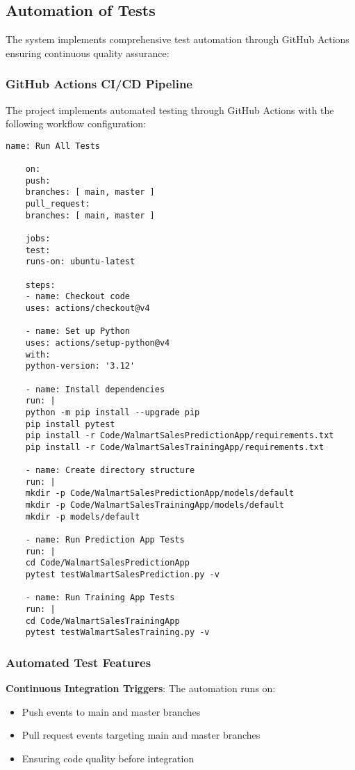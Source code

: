 \subsection{Automation of Tests}

The system implements comprehensive test automation through GitHub Actions ensuring continuous quality assurance:

\subsubsection{GitHub Actions CI/CD Pipeline}

The project implements automated testing through GitHub Actions with the following workflow configuration:

\begin{lstlisting}[language=MyPython, caption={GitHub Actions Test Automation Configuration}]
	name: Run All Tests
	
	on:
	push:
	branches: [ main, master ]
	pull_request:
	branches: [ main, master ]
	
	jobs:
	test:
	runs-on: ubuntu-latest
	
	steps:
	- name: Checkout code
	uses: actions/checkout@v4
	
	- name: Set up Python
	uses: actions/setup-python@v4
	with:
	python-version: '3.12'
	
	- name: Install dependencies
	run: |
	python -m pip install --upgrade pip
	pip install pytest
	pip install -r Code/WalmartSalesPredictionApp/requirements.txt
	pip install -r Code/WalmartSalesTrainingApp/requirements.txt
	
	- name: Create directory structure
	run: |
	mkdir -p Code/WalmartSalesPredictionApp/models/default
	mkdir -p Code/WalmartSalesTrainingApp/models/default
	mkdir -p models/default
	
	- name: Run Prediction App Tests
	run: |
	cd Code/WalmartSalesPredictionApp
	pytest testWalmartSalesPrediction.py -v
	
	- name: Run Training App Tests
	run: |
	cd Code/WalmartSalesTrainingApp
	pytest testWalmartSalesTraining.py -v
\end{lstlisting}

\subsubsection{Automated Test Features}

\textbf{Continuous Integration Triggers}: The automation runs on:
\begin{itemize}
	\item Push events to main and master branches
	\item Pull request events targeting main and master branches
	\item Ensuring code quality before integration
\end{itemize}

